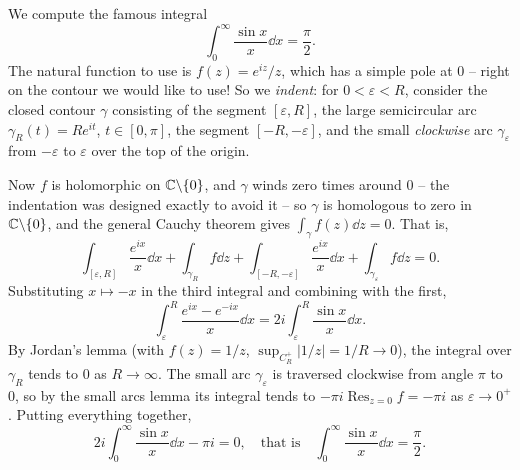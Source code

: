 \documentclass[a4paper]{scrartcl}
\begin{document}
\begin{example}
    We compute the famous integral
    $$
    \int_0^{\infty} \frac{\sin x}{x} \dd x = \frac{\pi}{2}.
    $$
    The natural function to use is $f(z) = e^{iz}/z$, which has a simple pole at $0$ -- right on the contour we would like to use! So we \emph{indent}: for $0 < \varepsilon < R$, consider the closed contour $\gamma$ consisting of the segment $[\varepsilon, R]$, the large semicircular arc $\gamma_R(t) = Re^{it}$, $t \in [0, \pi]$, the segment $[-R, -\varepsilon]$, and the small \emph{clockwise} arc $\gamma_\varepsilon$ from $-\varepsilon$ to $\varepsilon$ over the top of the origin.

    \begin{center}
    \end{center}

    Now $f$ is holomorphic on $\mathbb{C} \backslash \{0\}$, and $\gamma$ winds zero times around $0$ -- the indentation was designed exactly to avoid it -- so $\gamma$ is homologous to zero in $\mathbb{C} \backslash \{0\}$, and the general Cauchy theorem gives $\int_\gamma f(z) \dd z = 0$. That is,
    $$
    \int_{[\varepsilon, R]} \frac{e^{ix}}{x} \dd x + \int_{\gamma_R} f \dd z + \int_{[-R, -\varepsilon]} \frac{e^{ix}}{x} \dd x + \int_{\gamma_\varepsilon} f \dd z = 0.
    $$
    Substituting $x \mapsto -x$ in the third integral and combining with the first,
    $$
    \int_\varepsilon^R \frac{e^{ix} - e^{-ix}}{x} \dd x = 2i \int_\varepsilon^R \frac{\sin x}{x} \dd x.
    $$
    By Jordan's lemma (with $f(z) = 1/z$, $\sup_{C_R^+}|1/z| = 1/R \rightarrow 0$), the integral over $\gamma_R$ tends to $0$ as $R \rightarrow \infty$. The small arc $\gamma_\varepsilon$ is traversed clockwise from angle $\pi$ to $0$, so by the small arcs lemma its integral tends to $-\pi i \operatorname{Res}_{z = 0} f = -\pi i$ as $\varepsilon \rightarrow 0^+$. Putting everything together,
    $$
    2i\int_0^{\infty} \frac{\sin x}{x} \dd x - \pi i = 0, \quad \text{that is} \quad \int_0^\infty \frac{\sin x}{x} \dd x = \frac{\pi}{2}.
    $$
\end{example}
\end{document}
